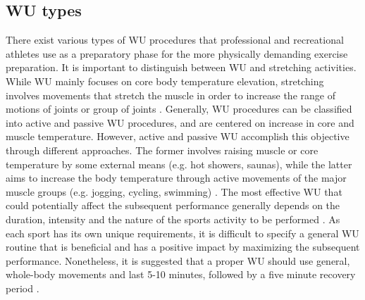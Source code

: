 \subsection{WU types}
There exist various types of WU procedures that professional and recreational athletes use as a preparatory phase for the more physically demanding exercise preparation. It is important to distinguish between WU and stretching activities. While WU mainly focuses on core body temperature elevation, stretching involves movements that stretch the muscle in order to increase the range of motions of joints or group of joints \cite{knudson2008warm}. 
Generally, WU procedures can be classified into active and passive WU procedures, and are centered on increase in core and muscle temperature. However, active and passive WU accomplish this objective through different approaches. The former involves raising muscle or core temperature by some external means (e.g. hot showers, saunas), while the latter aims to increase the body temperature through active movements of the major muscle groups (e.g. jogging, cycling, swimming) \cite{shellock1985warming, bishop2003warm2}. The most effective WU that could potentially affect the subsequent performance generally depends on the duration, intensity and the nature of the sports activity to be performed \cite{bishop2003warm2}. As each sport has its own unique requirements, it is difficult to specify a general WU routine that is beneficial and has a positive impact by maximizing the subsequent performance. Nonetheless, it is suggested that a proper WU should use general, whole-body movements and last 5-10 minutes, followed by a five minute recovery period \cite{bishop2003warm2}.  
